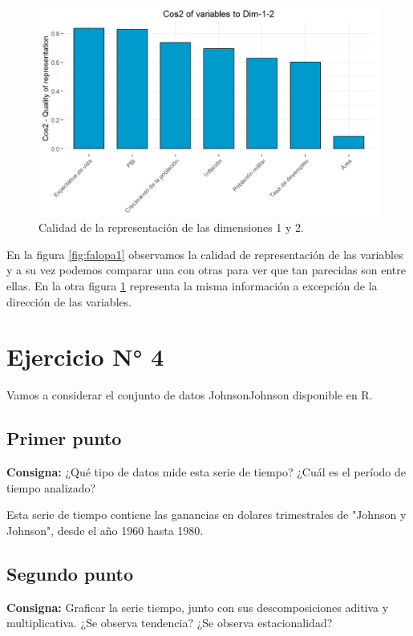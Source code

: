 \documentclass{article} %
\begin{document}
\begin{figure}[H]
	\centering
	\includegraphics[width=1\textwidth]{images/3-5-2}
	\caption{Calidad de la representación de las dimensiones 1 y 2.}
	\label{fig:falopa2}
\end{figure} 

En la figura \ref{fig:falopa1} observamos la calidad de representación de las variables y a su vez podemos comparar una con otras para ver que tan parecidas son entre ellas. En la otra figura \ref{fig:falopa2} representa la misma información a excepción de la dirección de las variables.

\section{Ejercicio N° 4}

Vamos a considerar el conjunto de datos JohnsonJohnson disponible en R.

\subsection{Primer punto}

\textbf{Consigna:} ¿Qué tipo de datos mide esta serie de tiempo? ¿Cuál es el período de tiempo analizado?

Esta serie de tiempo contiene las ganancias en dolares trimestrales de "Johnson y Johnson", desde el año 1960 hasta 1980.

\subsection{Segundo punto}

\textbf{Consigna:} Graficar la serie tiempo, junto con sus descomposiciones aditiva y multiplicativa. ¿Se observa tendencia? ¿Se observa estacionalidad?
\end{document}
